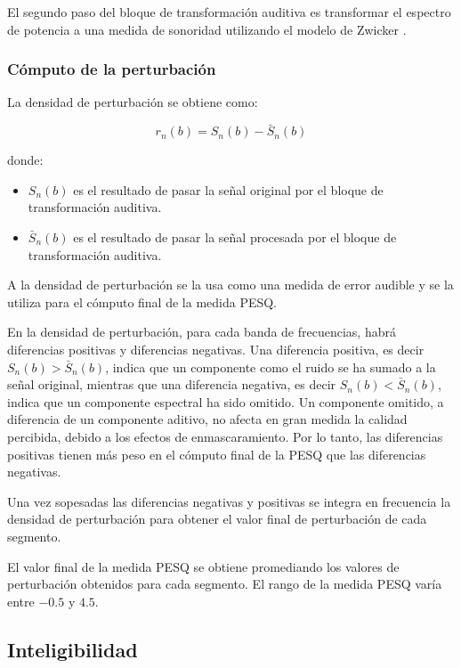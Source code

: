 El segundo paso del bloque de transformación auditiva es transformar el espectro de potencia a una medida de sonoridad utilizando el modelo de Zwicker \cite{a_revision_of_zwicker_s_loudness_model}.

\subsubsection{Cómputo de la perturbación}

La densidad de perturbación se obtiene como:

\begin{equation*}
	r_n(b) = S_n(b) - \bar{S}_n(b)
\end{equation*}

\noindent donde:

\begin{itemize}
	\item $S_n(b)$ es el resultado de pasar la señal original por el bloque de transformación auditiva.
	\item $\bar{S}_n(b)$ es el resultado de pasar la señal procesada por el bloque de transformación auditiva.
\end{itemize}

A la densidad de perturbación se la usa como una medida de error audible y se la utiliza para el cómputo final de la medida PESQ.

En la densidad de perturbación, para cada banda de frecuencias, habrá diferencias positivas y diferencias negativas. Una diferencia positiva, es decir $S_n(b) > \bar{S}_n(b)$, indica que un componente como el ruido se ha sumado a la señal original, mientras que una diferencia negativa, es decir $S_n(b) < \bar{S}_n(b)$, indica que un componente espectral ha sido omitido. Un componente omitido, a diferencia de un componente aditivo, no afecta en gran medida la calidad percibida, debido a los efectos de enmascaramiento. Por lo tanto, las diferencias positivas tienen más peso en el cómputo final de la PESQ que las diferencias negativas.

Una vez sopesadas las diferencias negativas y positivas se integra en frecuencia la densidad de perturbación para obtener el valor final de perturbación de cada segmento.

El valor final de la medida PESQ se obtiene promediando los valores de perturbación obtenidos para cada segmento. El rango de la medida PESQ varía entre $-0.5$ y $4.5$.

\subsection{Inteligibilidad}

